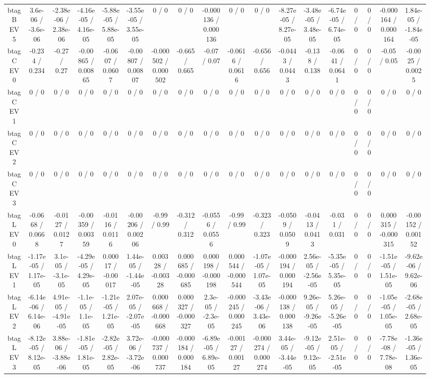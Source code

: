 \documentclass[10pt]{article}
\begin{document}
\begin{table}[htbp]
\begin{center}
\begin{tabular}{|c|c|c|c|c|c|c|c|c|c|c|c|c|c|c|c|c|c|}
  btag B EV 5 & 3.6e-06 / -3.6e-06 & -2.38e-06 / 2.38e-06 & -4.16e-05 / 4.16e-05 & -5.88e-05 / 5.88e-05 & -3.55e-05 / 3.55e-05 & 0 / 0 & 0 / 0 & -0.000136 / 0.000136 & 0 / 0 & 0 / 0 & -8.27e-05 / 8.27e-05 & -3.48e-05 / 3.48e-05 & -6.74e-05 / 6.74e-05 & 0 / 0 & 0 / 0 & -0.000164 / 0.000164 & 1.84e-05 / -1.84e-05 \\ 
  btag C EV 0 & -0.234 / 0.234 & -0.27 / 0.27 & -0.00865 / 0.00865 & -0.0607 / 0.0607 & -0.00807 / 0.00807 & -0.000502 / 0.000502 & -0.665 / 0.665 & -0.07 / 0.07 & -0.0616 / 0.0616 & -0.656 / 0.656 & -0.0443 / 0.0443 & -0.138 / 0.138 & -0.0641 / 0.0641 & 0 / 0 & 0 / 0 & -0.05 / 0.05 & -0.0025 / 0.0025 \\ 
  btag C EV 1 & 0 / 0 & 0 / 0 & 0 / 0 & 0 / 0 & 0 / 0 & 0 / 0 & 0 / 0 & 0 / 0 & 0 / 0 & 0 / 0 & 0 / 0 & 0 / 0 & 0 / 0 & 0 / 0 & 0 / 0 & 0 / 0 & 0 / 0 \\ 
  btag C EV 2 & 0 / 0 & 0 / 0 & 0 / 0 & 0 / 0 & 0 / 0 & 0 / 0 & 0 / 0 & 0 / 0 & 0 / 0 & 0 / 0 & 0 / 0 & 0 / 0 & 0 / 0 & 0 / 0 & 0 / 0 & 0 / 0 & 0 / 0 \\ 
  btag C EV 3 & 0 / 0 & 0 / 0 & 0 / 0 & 0 / 0 & 0 / 0 & 0 / 0 & 0 / 0 & 0 / 0 & 0 / 0 & 0 / 0 & 0 / 0 & 0 / 0 & 0 / 0 & 0 / 0 & 0 / 0 & 0 / 0 & 0 / 0 \\ 
  btag L EV 0 & -0.0668 / 0.0668 & -0.0127 / 0.0127 & -0.00359 / 0.00359 & -0.0116 / 0.0116 & -0.00206 / 0.00206 & -0.99 / 0.99 & -0.312 / 0.312 & -0.0556 / 0.0556 & -0.99 / 0.99 & -0.323 / 0.323 & -0.0509 / 0.0509 & -0.0413 / 0.0413 & -0.031 / 0.031 & 0 / 0 & 0 / 0 & 0.000315 / -0.000315 & -0.00152 / 0.00152 \\ 
  btag L EV 1 & -1.17e-05 / 1.17e-05 & 3.1e-05 / -3.1e-05 & -4.29e-05 / 4.29e-05 & 0.00017 / -0.00017 & 1.44e-05 / -1.44e-05 & 0.00328 / -0.00328 & 0.000685 / -0.000685 & 0.000198 / -0.000198 & 0.000544 / -0.000544 & -1.07e-05 / 1.07e-05 & -0.000194 / 0.000194 & 2.56e-05 / -2.56e-05 & -5.35e-05 / 5.35e-05 & 0 / 0 & 0 / 0 & -1.51e-05 / 1.51e-05 & -9.62e-06 / 9.62e-06 \\ 
  btag L EV 2 & -6.14e-06 / 6.14e-06 & 4.91e-05 / -4.91e-05 & -1.1e-05 / 1.1e-05 & -1.21e-05 / 1.21e-05 & 2.07e-05 / -2.07e-05 & 0.000668 / -0.000668 & 0.000327 / -0.000327 & 2.3e-05 / -2.3e-05 & -0.000245 / 0.000245 & -3.43e-06 / 3.43e-06 & -0.000138 / 0.000138 & 9.26e-05 / -9.26e-05 & 5.26e-05 / -5.26e-05 & 0 / 0 & 0 / 0 & -1.05e-05 / 1.05e-05 & -2.68e-05 / 2.68e-05 \\ 
  btag L EV 3 & -8.12e-05 / 8.12e-05 & 3.88e-06 / -3.88e-06 & -1.81e-05 / 1.81e-05 & -2.82e-05 / 2.82e-05 & 3.72e-06 / -3.72e-06 & -0.000737 / 0.000737 & -0.000184 / 0.000184 & -6.89e-05 / 6.89e-05 & -0.00127 / 0.00127 & -0.000274 / 0.000274 & 3.44e-05 / -3.44e-05 & -9.12e-05 / 9.12e-05 & 2.51e-05 / -2.51e-05 & 0 / 0 & 0 / 0 & -7.78e-08 / 7.78e-08 & -1.36e-05 / 1.36e-05 \\ 

\end{tabular}
\end{center}
\end{table}
\end{document}
